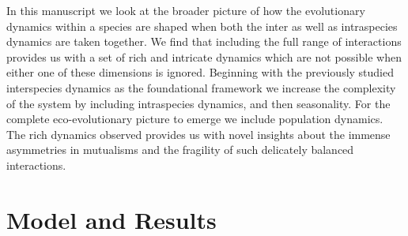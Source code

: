 \documentclass[12pt]{article}
\begin{document}


In this manuscript we look at the broader picture of how the evolutionary dynamics within a species are shaped when both the inter as well as intraspecies dynamics are taken together. 
We find that including the full range of interactions provides us with a set of rich and intricate dynamics which are not possible when either one of these dimensions is ignored.
Beginning with the previously studied interspecies dynamics as the foundational framework \citep{gokhale:PRSB:2012} we increase the complexity of the system by including intraspecies dynamics, and then seasonality.
For the complete eco-evolutionary picture to emerge we include population dynamics.
The rich dynamics observed provides us with novel insights about the immense asymmetries in mutualisms and the fragility of such delicately balanced interactions.



\section{Model and Results}
\end{document}
